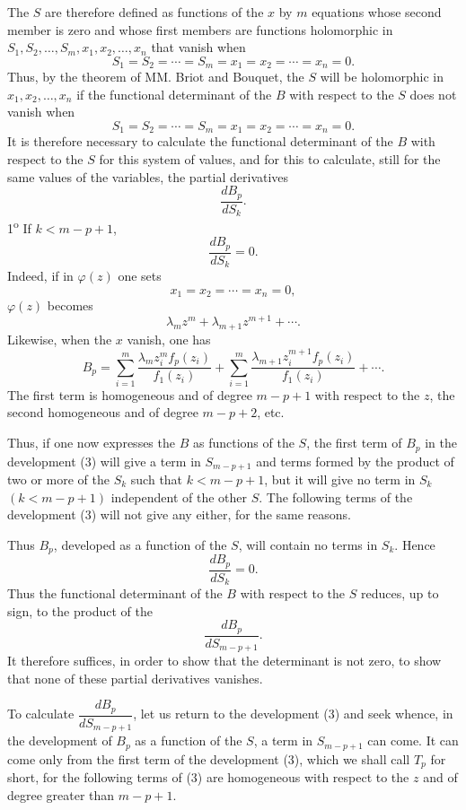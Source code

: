 \documentclass[11pt]{article}
\begin{document}
The $S$ are therefore defined as functions of the $x$ by $m$ equations whose second member is zero and whose first members are functions holomorphic in $S_1,S_2,\ldots,S_m,x_1,x_2,\ldots,x_n$ that vanish when
\[
S_1=S_2=\cdots=S_m=x_1=x_2=\cdots=x_n=0.
\]
Thus, by the theorem of MM. Briot and Bouquet, the $S$ will be holomorphic in $x_1,x_2,\ldots,x_n$ if the functional determinant of the $B$ with respect to the $S$ does not vanish when
\[
S_1=S_2=\cdots=S_m=x_1=x_2=\cdots=x_n=0.
\]
It is therefore necessary to calculate the functional determinant of the $B$ with respect to the $S$ for this system of values, and for this to calculate, still for the same values of the variables, the partial derivatives
\[
\frac{dB_p}{dS_k}.
\]
1\textsuperscript{o} If $k<m-p+1$,
\[
\frac{dB_p}{dS_k}=0.
\]
Indeed, if in $\varphi(z)$ one sets
\[
x_1=x_2=\cdots=x_n=0,
\]
$\varphi(z)$ becomes
\[
\lambda_m z^m+\lambda_{m+1}z^{m+1}+\cdots.
\]
Likewise, when the $x$ vanish, one has
\begin{equation*}\tag{3}
B_p=\sum_{i=1}^m \frac{\lambda_m z_i^m f_p(z_i)}{f_1(z_i)}+
\sum_{i=1}^m \frac{\lambda_{m+1}z_i^{m+1} f_p(z_i)}{f_1(z_i)}+\cdots .
\end{equation*}
The first term is homogeneous and of degree $m-p+1$ with respect to the $z$, the second homogeneous and of degree $m-p+2$, etc.

Thus, if one now expresses the $B$ as functions of the $S$, the first term of $B_p$ in the development (3) will give a term in $S_{m-p+1}$ and terms formed by the product of two or more of the $S_k$ such that $k<m-p+1$, but it will give no term in $S_k$ $(k<m-p+1)$ independent of the other $S$. The following terms of the development (3) will not give any either, for the same reasons.

Thus $B_p$, developed as a function of the $S$, will contain no terms in $S_k$. Hence
\[
\frac{dB_p}{dS_k}=0.
\]
Thus the functional determinant of the $B$ with respect to the $S$ reduces, up to sign, to the product of the
\[
\frac{dB_p}{dS_{m-p+1}}.
\]
It therefore suffices, in order to show that the determinant is not zero, to show that none of these partial derivatives vanishes.

To calculate $\dfrac{dB_p}{dS_{m-p+1}}$, let us return to the development (3) and seek whence, in the development of $B_p$ as a function of the $S$, a term in $S_{m-p+1}$ can come. It can come only from the first term of the development (3), which we shall call $T_p$ for short, for the following terms of (3) are homogeneous with respect to the $z$ and of degree greater than $m-p+1$.
\end{document}
